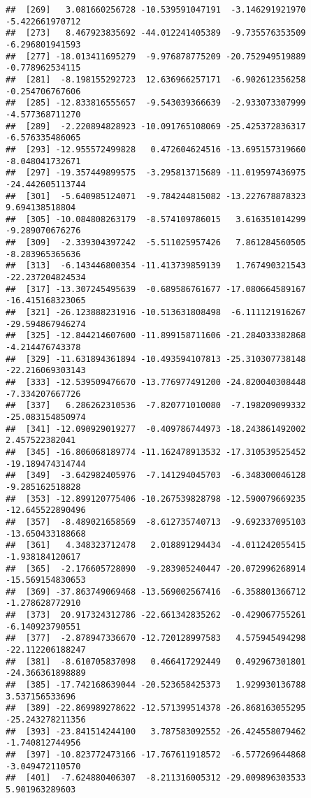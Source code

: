 \documentclass[
]{article}
\begin{document}
\begin{verbatim}
##  [269]   3.081660256728 -10.539591047191  -3.146291921970  -5.422661970712
##  [273]   8.467923835692 -44.012241405389  -9.735576353509  -6.296801941593
##  [277] -18.013411695279  -9.976878775209 -20.752949519889  -0.778962534115
##  [281]  -8.198155292723  12.636966257171  -6.902612356258  -0.254706767606
##  [285] -12.833816555657  -9.543039366639  -2.933073307999  -4.577368711270
##  [289]  -2.220894828923 -10.091765108069 -25.425372836317  -6.576335486065
##  [293] -12.955572499828   0.472604624516 -13.695157319660  -8.048041732671
##  [297] -19.357449899575  -3.295813715689 -11.019597436975 -24.442605113744
##  [301]  -5.640985124071  -9.784244815082 -13.227678878323   9.694138518804
##  [305] -10.084808263179  -8.574109786015   3.616351014299  -9.289070676276
##  [309]  -2.339304397242  -5.511025957426   7.861284560505  -8.283965365636
##  [313]  -6.143446800354 -11.413739859139   1.767490321543 -22.237204824534
##  [317] -13.307245495639  -0.689586761677 -17.080664589167 -16.415168323065
##  [321] -26.123888231916 -10.513631808498  -6.111121916267 -29.594867946274
##  [325] -12.844214607600 -11.899158711606 -21.284033382868  -4.214476743378
##  [329] -11.631894361894 -10.493594107813 -25.310307738148 -22.216069303143
##  [333] -12.539509476670 -13.776977491200 -24.820040308448  -7.334207667726
##  [337]   6.286262310536  -7.820771010080  -7.198209099332 -25.083154850974
##  [341] -12.090929019277  -0.409786744973 -18.243861492002   2.457522382041
##  [345] -16.806068189774 -11.162478913532 -17.310539525452 -19.189474314744
##  [349]  -3.642982405976  -7.141294045703  -6.348300046128  -9.285162518828
##  [353] -12.899120775406 -10.267539828798 -12.590079669235 -12.645522890496
##  [357]  -8.489021658569  -8.612735740713  -9.692337095103 -13.650433188668
##  [361]   4.348323712478   2.018891294434  -4.011242055415  -1.938184120617
##  [365]  -2.176605728090  -9.283905240447 -20.072996268914 -15.569154830653
##  [369] -37.863749069468 -13.569002567416  -6.358801366712  -1.278628772910
##  [373]  20.917324312786 -22.661342835262  -0.429067755261  -6.140923790551
##  [377]  -2.878947336670 -12.720128997583   4.575945494298 -22.112206188247
##  [381]  -8.610705837098   0.466417292449   0.492967301801 -24.366361898889
##  [385] -17.742168639044 -20.523658425373   1.929930136788   3.537156533696
##  [389] -22.869989278622 -12.571399514378 -26.868163055295 -25.243278211356
##  [393] -23.841514244100   3.787583092552 -26.424558079462  -1.740812744956
##  [397] -10.823772473166 -17.767611918572  -6.577269644868  -3.049472110570
##  [401]  -7.624880406307  -8.211316005312 -29.009896303533   5.901963289603

\end{verbatim}
\end{document}
